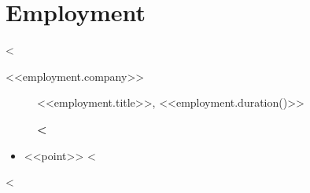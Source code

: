 \section{Employment}
<%
\begin{description}
    \item [<<employment.company>>] <<employment.title>>, <<employment.duration()>>
    \item [] \textbf{\footnotesize{
    <%
    }}
\end{description}
\begin{itemize}
    <%
    \item <<point>>
    <%
\end{itemize}
<%